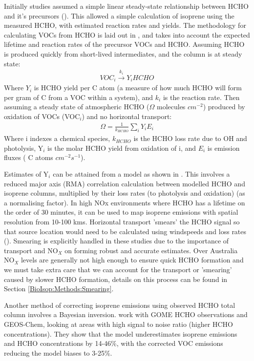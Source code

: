     Initially studies assumed a simple linear steady-state relationship between HCHO and it's precursors (\cite{Palmer2003, Palmer2006, Millet2006}).
    This allowed a simple calculation of isoprene using the measured HCHO, with estimated reaction rates and yields.
    The methodology for calculating VOCs from HCHO is laid out in \cite{Palmer2003}, and takes into account the expected lifetime and reaction rates of the precursor VOCs and HCHO.
    Assuming HCHO is produced quickly from short-lived intermediates, and the column is at steady state:
    \begin{eqnarray*}
      VOC_i \overset{k_i}{\rightarrow} Y_i HCHO
    \end{eqnarray*}
    Where $Y_i$ is HCHO yield per C atom (a measure of how much HCHO will form per gram of C from a VOC within a system), and $k_i$ is the reaction rate.
    Then assuming a steady state of atmospheric HCHO ($\Omega$ molecules $cm^{-2}$) produced by oxidation of VOCs (VOC$_i$) and no horizontal transport:
    \begin{eqnarray*}
      \Omega = \frac{1}{k_{HCHO}} \sum_{i} Y_i E_i
    \end{eqnarray*}
    Where i indexes a chemical species, $k_{HCHO}$ is the HCHO loss rate due to OH and photolysis, Y$_i$ is the molar HCHO yield from oxidation of i, and $E_i$ is emission fluxes ( C atoms $cm^{-2}s^{-1}$).
    
    Estimates of Y$_i$ can be attained from a model as shown in \cite{Millet2006}.
    This involves a reduced major axis (RMA) correlation calculation between modelled HCHO and isoprene columns, multiplied by their loss rates (to photolysis and oxidation) (as a normalising factor).  
    In high NOx environments where HCHO has a lifetime on the order of 30 minutes, it can be used to map isoprene emissions with spatial resolution from 10-100 kms.
    Horizontal transport 'smears' the HCHO signal so that source location would need to be calculated using windspeeds and loss rates (\cite{Palmer2001,Palmer2003}).
    Smearing is explicitly handled in these studies due to the importance of transport and NO$_X$ on forming robust and accurate estimates.
    Over Australia NO$_X$ levels are generally not high enough to ensure quick HCHO formation and we must take extra care that we can account for the transport or 'smearing' caused by slower HCHO formation, details on this process can be found in Section \ref{BioIsop:Methods:Smearing}.
    
    Another method of correcting isoprene emissions using observed HCHO total column involves a Bayesian inversion.
    \cite{Shim2005} work with GOME HCHO observations and GEOS-Chem, looking at areas with high signal to noise ratio (higher HCHO concentrations).
    They show that the model underestimates isoprene emissions and HCHO concentrations by 14-46\%, with the corrected VOC emissions reducing the model biases to 3-25\%.
    
